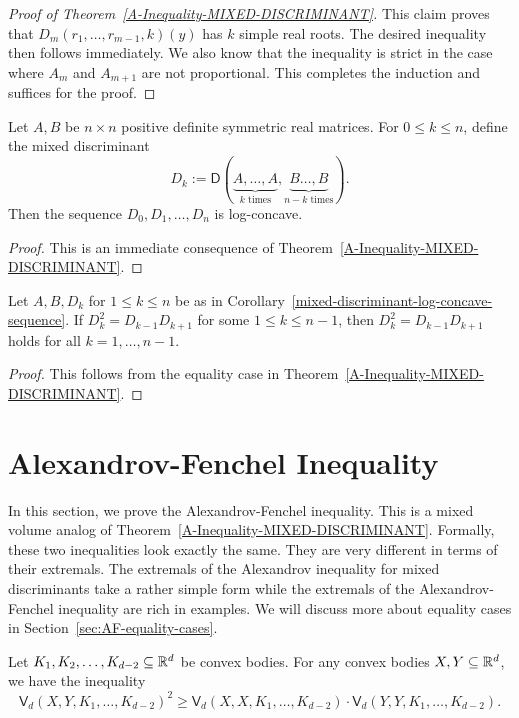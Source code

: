 \documentclass{puthesis-UG}
\begin{document}
\begin{proof}[Proof of Theorem~\ref{A-Inequality-MIXED-DISCRIMINANT}]
	This claim proves that $D_m(r_1, \ldots, r_{m-1}, k)(y)$ has $k$ simple real roots. The desired inequality then follows immediately. We also know that the inequality is strict in the case where $A_m$ and $A_{m+1}$ are not proportional. This completes the induction and suffices for the proof. 
\end{proof}


\begin{cor} \label{mixed-discriminant-log-concave-sequence}
	Let $A, B$ be $n \times n$ positive definite symmetric real matrices. For $0 \leq k \leq n$, define the mixed discriminant
	\[
		D_k := \mathsf{D} (\underbrace{A, \ldots, A}_{k \text{ times}}, \underbrace{B \ldots, B}_{n-k \text{ times}}).
	\]
	Then the sequence $D_0, D_1, \ldots, D_n$ is log-concave. 
\end{cor}

\begin{proof}
	This is an immediate consequence of Theorem~\ref{A-Inequality-MIXED-DISCRIMINANT}. 
\end{proof}

\begin{cor} \label{cor-one-implies-all-mixed-discriminants}
	Let $A, B, D_k$ for $1 \leq k \leq n$ be as in Corollary~\ref{mixed-discriminant-log-concave-sequence}. If $D_k^2 = D_{k-1}D_{k+1}$ for some $1 \leq k \leq n-1$, then $D_k^2 = D_{k-1} D_{k+1}$ holds for all $k = 1, \ldots, n-1$. 
\end{cor}

\begin{proof}
	This follows from the equality case in Theorem~\ref{A-Inequality-MIXED-DISCRIMINANT}. 
\end{proof}
\section{Alexandrov-Fenchel Inequality} \label{sec:af-inequality}

In this section, we prove the Alexandrov-Fenchel inequality. This is a mixed volume analog of Theorem~\ref{A-Inequality-MIXED-DISCRIMINANT}. Formally, these two inequalities look exactly the same. They are very different in terms of their extremals. The extremals of the Alexandrov inequality for mixed discriminants take a rather simple form while the extremals of the Alexandrov-Fenchel inequality are rich in examples. We will discuss more about equality cases in Section~\ref{sec:AF-equality-cases}. 

\begin{thm} \label{AF-inequality}
	Let $K_1, K_2, \ldots, K_{d-2} \subseteq \mathbb{R}^d$ be convex bodies. For any convex bodies $X, Y \subseteq \mathbb{R}^d$, we have the inequality
	\[
		\mathsf{V}_d(X, Y, K_1, \ldots, K_{d-2})^2 \geq \mathsf{V}_d(X, X, K_1, \ldots, K_{d-2}) \cdot \mathsf{V}_d(Y, Y, K_1, \ldots, K_{d-2}). 
	\]
\end{thm}
\end{document}
